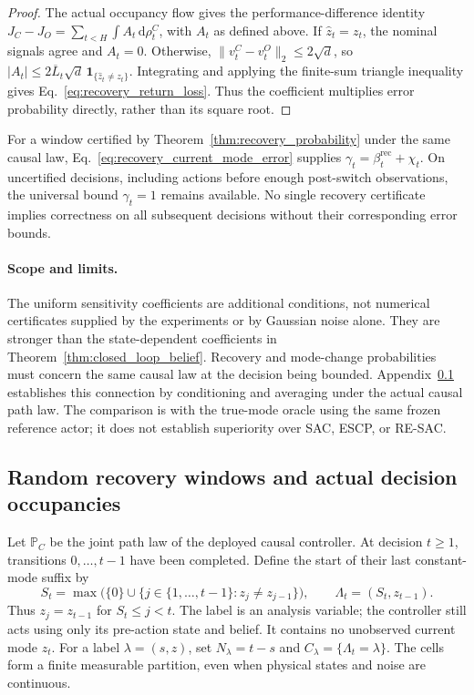 \begin{proof}
The actual occupancy flow gives the performance-difference identity
$J_C-J_O=\sum_{t<H}\int A_t\,\mathrm d\rho_t^C$, with $A_t$ as defined above.
If $\hat z_t=z_t$, the nominal signals agree and $A_t=0$.
Otherwise, $\|v_t^C-v_t^O\|_2\le2\sqrt d$, so
$|A_t|\le2\overline L_t\sqrt d\,\mathbf1_{\{\hat z_t\ne z_t\}}$.
Integrating and applying the finite-sum triangle inequality gives Eq.~\eqref{eq:recovery_return_loss}.
Thus the coefficient multiplies error probability directly, rather than its square root.
\end{proof}

For a window certified by Theorem~\ref{thm:recovery_probability} under the same causal law, Eq.~\eqref{eq:recovery_current_mode_error} supplies $\gamma_t=\beta_t^{\mathrm{rec}}+\chi_t$.
On uncertified decisions, including actions before enough post-switch observations, the universal bound $\gamma_t=1$ remains available.
No single recovery certificate implies correctness on all subsequent decisions without their corresponding error bounds.

\paragraph{Scope and limits.}
The uniform sensitivity coefficients are additional conditions, not numerical certificates supplied by the experiments or by Gaussian noise alone.
They are stronger than the state-dependent coefficients in Theorem~\ref{thm:closed_loop_belief}.
Recovery and mode-change probabilities must concern the same causal law at the decision being bounded.
Appendix~\ref{app:random_recovery_windows} establishes this connection by conditioning and averaging under the actual causal path law.
The comparison is with the true-mode oracle using the same frozen reference actor; it does not establish superiority over SAC, ESCP, or RE-SAC.

\subsection{Random recovery windows and actual decision occupancies}
\label{app:random_recovery_windows}

Let $\mathbb P_C$ be the joint path law of the deployed causal controller.
At decision $t\ge1$, transitions $0,\ldots,t-1$ have been completed.
Define the start of their last constant-mode suffix by
\begin{equation}
 S_t=\max\bigl(\{0\}\cup
 \{j\in\{1,\ldots,t-1\}:z_j\ne z_{j-1}\}\bigr),\qquad
 \Lambda_t=(S_t,z_{t-1}).
 \label{eq:observed_dwell_label}
\end{equation}
Thus $z_j=z_{t-1}$ for $S_t\le j<t$.
The label is an analysis variable; the controller still acts using only its pre-action state and belief.
It contains no unobserved current mode $z_t$.
For a label $\lambda=(s,z)$, set $N_\lambda=t-s$ and
$C_\lambda=\{\Lambda_t=\lambda\}$.
The cells form a finite measurable partition, even when physical states and noise are continuous.

